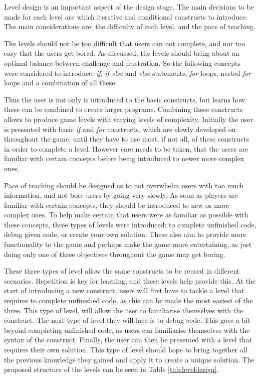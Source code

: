 \documentclass[a4paper,11.5pt]{report}
\numberwithin{figure}{section}
\numberwithin{table}{section}
\numberwithin{equation}{section}
\numberwithin{equation}{section}
\begin{document}

Level design is an important aspect of the design stage. The main decisions to be made for each level are which iterative and conditional constructs to introduce. The main considerations are: the difficulty of each level, and the pace of teaching.

The levels should not be too difficult that users can not complete, and nor too easy that the users get bored. As discussed, the levels should bring about an optimal balance between challenge and frustration. So the following concepts were considered to introduce: \textit{if}, \textit{if else} and \textit{else} statements, \textit{for} loops, nested \textit{for} loops and a combination of all these.

Thus the user is not only is introduced to the basic constructs, but learns how these can be combined to create larger programs. Combining these constructs allows to produce game levels with varying levels of complexity. Initially the user is presented with basic \textit{if} and \textit{for} constructs, which are slowly developed on throughout the game, until they have to use most, if not all, of these constructs in order to complete a level. However care needs to be taken, that the users are familiar with certain concepts before being introduced to newer more complex ones.

Pace of teaching should be designed as to not overwhelm users with too much information, and not bore users by going very slowly. As soon as players are familiar with certain concepts, they should be introduced to new or more complex ones. To help make certain that users were as familiar as possible with these concepts, three types of levels were introduced: to complete unfinished code, debug given code, or create your own solution. These also aim to provide more functionality to the game and perhaps make the game more entertaining, as just doing only one of three objectives throughout the game may get boring.

These three types of level allow the same constructs to be reused in different scenarios. Repetition is key for learning, and these levels help provide this. At the start of introducing a new construct, users will first have to tackle a level that requires to complete unfinished code, as this can be made the most easiest of the three. This type of level, will allow the user to familiarise themselves with the construct. The next type of level they will face is to debug code. This goes a bit beyond completing unfinished code, as users can familiarise themselves with the syntax of the construct. Finally, the user can then be presented with a level that requires their own solution. This type of level should hope to bring together all the previous knowledge they gained and apply it to create a unique solution. The proposed structure of the levels can be seen in Table \ref{tab:leveldesign}. 
\end{document}

